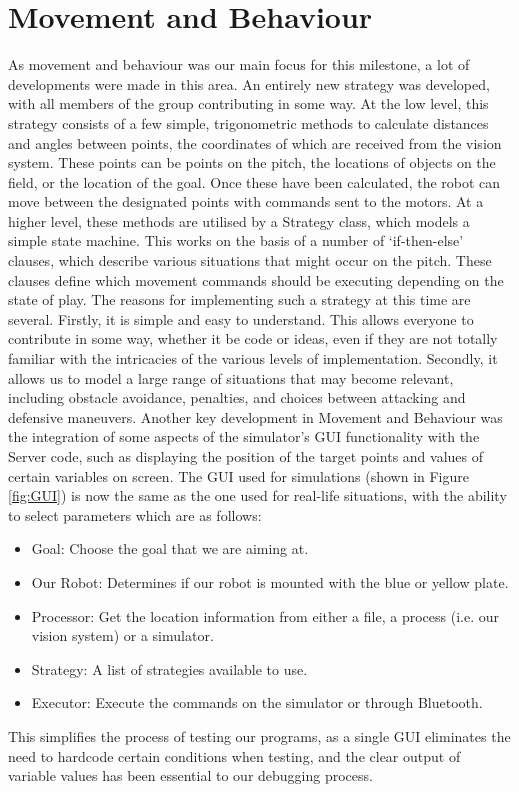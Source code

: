 \documentclass[conference,12pt]{IEEEtran}
\begin{document}
\section{Movement and Behaviour}
\vspace{-2 mm}
As movement and behaviour was our main focus for this milestone, a lot of developments were made in this area. An entirely new strategy was developed, with all members of the group contributing in some way. At the low level, this strategy consists of a few simple, trigonometric methods to calculate distances and angles between points, the coordinates of which are received from the vision system. These points can be points on the pitch, the locations of objects on the field, or the location of the goal. Once these have been calculated, the robot can move between the designated points with commands sent to the motors. At a higher level, these methods are utilised by a Strategy class, which models a simple state machine. This works on the basis of a number of ‘if-then-else’ clauses, which describe various situations that might occur on the pitch. These clauses define which movement commands should be executing depending on the state of play. The reasons for implementing such a strategy at this time are several. Firstly, it is simple and easy to understand. This allows everyone to contribute in some way, whether it be code or ideas, even if they are not totally familiar with the intricacies of the various levels  of implementation. Secondly, it allows us to model a large range of situations that may become relevant, including obstacle avoidance, penalties, and choices between attacking and defensive maneuvers.
Another key development in Movement and Behaviour was the integration of some aspects of the simulator’s GUI functionality with the Server code, such as displaying the position of the target points and values of certain variables on screen. The GUI used for simulations (shown in Figure \ref{fig:GUI}) is now the same as the one used for real-life situations, with the ability to select parameters which are as follows:
\begin{itemize}
\item{Goal:} Choose the goal that we are aiming at.
\item{Our Robot:} Determines if our robot is mounted with the blue or yellow plate.
\item{Processor:} Get the location information from either a file, a process (i.e. our vision system) or a simulator.
\item{Strategy:} A list of strategies available to use.
\item{Executor:} Execute the commands on the simulator or through Bluetooth.
\end{itemize}
This simplifies the process of testing our programs, as a single GUI eliminates the need to hardcode certain conditions when testing, and the clear output of variable values has been essential to our debugging process.
\vspace{-2 mm}
\end{document}
